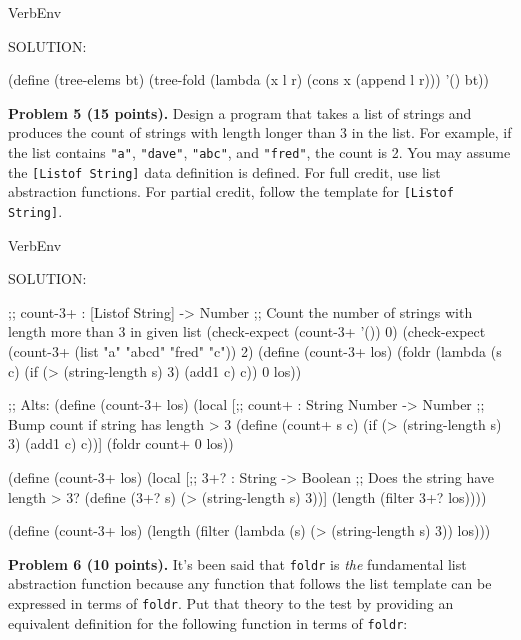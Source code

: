 \documentclass[12pt]{article}
\begin{document}
\begin{SaveVerbatim}{VerbEnv}


SOLUTION:

(define (tree-elems bt)
  (tree-fold (lambda (x l r) (cons x (append l r))) '() bt))

\end{SaveVerbatim}




\newpage
\noindent
{\bf Problem 5 (15 points).}  
%
Design a program that takes a list of strings and produces the count
of strings with length longer than 3 in the list.  For example, if the
list contains {\tt "a"}, {\tt "dave"}, {\tt "abc"}, and {\tt "fred"},
the count is 2.  You may assume the {\tt{[Listof String]}} data
definition is defined.
%
For full credit, use list abstraction functions.  For partial credit,
follow the template for {\tt{[Listof String]}}.


\begin{SaveVerbatim}{VerbEnv}


SOLUTION:

;; count-3+ : [Listof String] -> Number
;; Count the number of strings with length more than 3 in given list
(check-expect (count-3+ '()) 0)
(check-expect (count-3+ (list "a" "abcd" "fred" "c")) 2)
(define (count-3+ los)
  (foldr (lambda (s c) (if (> (string-length s) 3) (add1 c) c)) 0 los))

;; Alts:
(define (count-3+ los)
  (local [;; count+ : String Number -> Number
          ;; Bump count if string has length > 3
          (define (count+ s c) 
            (if (> (string-length s) 3) (add1 c) c))]
    (foldr count+ 0 los))

(define (count-3+ los)
  (local [;; 3+? : String -> Boolean
          ;; Does the string have length > 3?
          (define (3+? s) 
            (> (string-length s) 3))]
    (length (filter 3+? los))))

(define (count-3+ los)
  (length (filter (lambda (s) (> (string-length s) 3)) los)))
\end{SaveVerbatim}




\newpage

\noindent
{\bf Problem 6 (10 points).}
%
It's been said that {\tt foldr} is \emph{the} fundamental list
abstraction function because any function that follows the list
template can be expressed in terms of {\tt foldr}.  Put that theory to
the test by providing an equivalent definition for the following
function in terms of {\tt foldr}:
\end{document}
